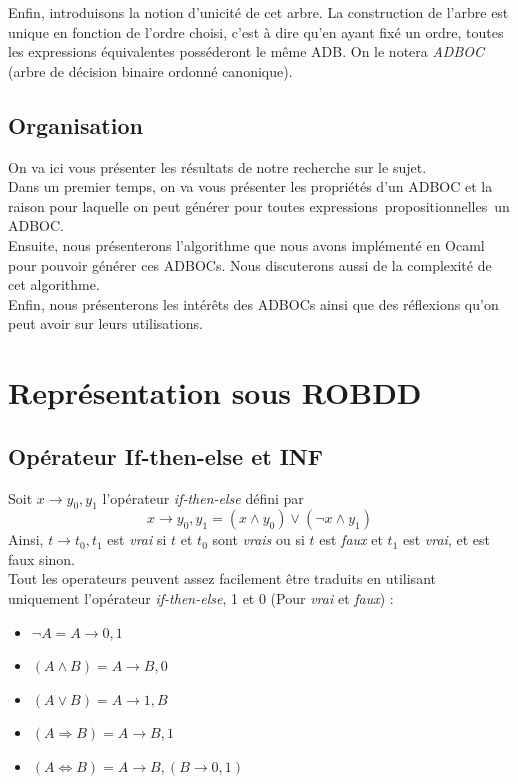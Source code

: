 \documentclass[a4paper, oneside]{report}
\newcommand{\expps}{expressions~propositionnelles~}
\begin{document}
Enfin, introduisons la notion d'unicité de cet arbre. La construction de l'arbre est unique en fonction de l'ordre choisi, c'est à dire qu'en ayant fixé un ordre, toutes les expressions équivalentes posséderont le même ADB. On le notera \textit{ADBOC} (arbre de décision binaire ordonné canonique).\\
 
\section*{Organisation}
On va ici vous présenter les résultats de notre recherche sur le sujet.\\
Dans un premier temps, on va vous présenter les propriétés d'un ADBOC et la raison pour laquelle on peut générer pour toutes \expps un ADBOC.\\
Ensuite, nous présenterons l'algorithme que nous avons implémenté en Ocaml pour pouvoir générer ces ADBOCs. Nous discuterons aussi de la complexité de cet algorithme.\\
Enfin, nous présenterons les intérêts des ADBOCs ainsi que des réflexions qu'on peut avoir sur leurs utilisations.  



\chapter{Représentation sous ROBDD}

\section{Opérateur If-then-else et INF}

Soit $ x \rightarrow y_0, y_1 $ l'opérateur \textit{if-then-else} défini par \\
$$ x \rightarrow y_0, y_1 = ( x \wedge y_0 ) \vee ( \neg x \wedge y_1 )$$
Ainsi, $ t \rightarrow t_0, t_1 $ est \textit{vrai} si $t$ et $t_0$ sont \textit{vrais} ou si $t$ est \textit{faux} et $t_1$ est \textit{vrai}, et est faux sinon.\\
Tout les operateurs peuvent assez facilement être traduits en utilisant uniquement l'opérateur \textit{if-then-else}, 1 et 0 (Pour \textit{vrai} et \textit{faux}) :\\

\begin{itemize}
\item $ \neg A = A \rightarrow 0, 1$
\item $ (A \wedge B) = A \rightarrow B, 0$
\item $ (A \vee B) = A \rightarrow 1, B$
\item $ (A \Rightarrow B) = A \rightarrow B, 1$
\item $ (A \Leftrightarrow B) = A \rightarrow B, (B \rightarrow 0, 1)$
\end{itemize}
\end{document}
